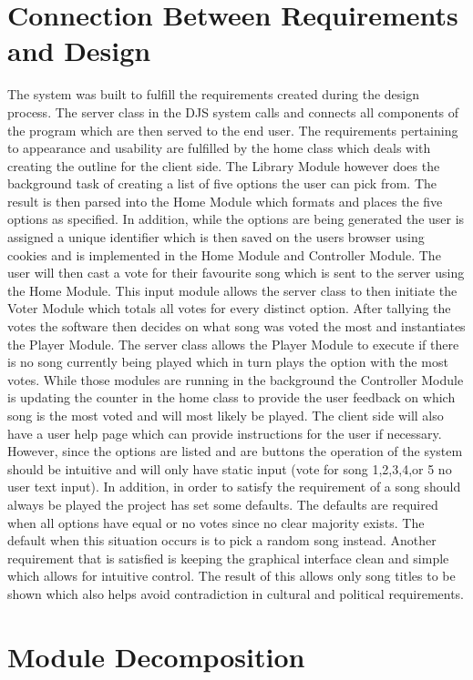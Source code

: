 \documentclass[12pt, titlepage]{article}
\begin{document}
\section{Connection Between Requirements and Design} \label{SecConnection}
The system was built to fulfill the requirements created during the design process. The server class in the DJS system calls and connects all components of the program which are then served to the end user. The requirements pertaining to appearance and usability are fulfilled by the home class which deals with creating the outline for the client side. The Library Module however does the background task of creating a list of five options the user can pick from. The result is then parsed into the Home Module which formats and places the five options as specified. In addition, while the options are being generated the user is assigned a unique identifier which is then saved on the users browser using cookies and is implemented in the Home Module and Controller Module. The user will then cast a vote for their favourite song which is sent to the server using the Home Module. This input module allows the server class to then initiate the Voter Module which totals all votes for every distinct option. After tallying the votes the software then decides on what song was voted the most and instantiates the Player Module. The server class allows the Player Module to execute if there is no song currently being played which in turn plays the option with the most votes. While those modules are running in the background the Controller Module is updating the counter in the home class to provide the user feedback on which song is the most voted and will most likely be played. The client side will also have a user help page which can provide instructions for the user if necessary. However, since the options are listed and are buttons the operation of the system should be intuitive and will only have static input (vote for song 1,2,3,4,or 5 no user text input). In addition, in order to satisfy the requirement of a song should always be played the project has set some defaults. The defaults are required when all options have equal or no votes since no clear majority exists. The default when this situation occurs is to pick a random song instead. Another requirement that is satisfied is keeping the graphical interface clean and simple which allows for intuitive control. The result of this allows only song titles to be shown which also helps avoid contradiction in cultural and political requirements.


\section{Module Decomposition} \label{SecMD}
\end{document}
